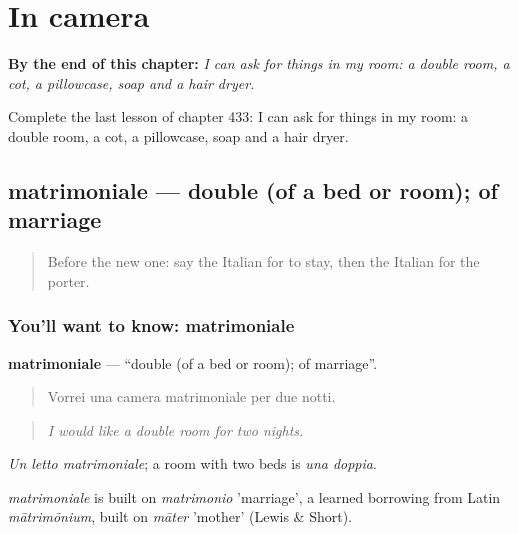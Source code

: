 
\chapter{In camera}
\label{ch:it-in-camera}

\begin{chapteropening}
\textbf{By the end of this chapter:} \emph{I can ask for things in my room: a double room, a cot, a pillowcase, soap and a hair dryer.}

Complete the last lesson of chapter 433: I can ask for things in my room: a double room, a cot, a pillowcase, soap and a hair dryer.
\end{chapteropening}

\section[matrimoniale]{matrimoniale — double (of a bed or room); of marriage}

\label{lesson:IT-C433-matrimoniale}



\begin{quote}
Before the new one: say the Italian for to stay, then the Italian for the porter.
\end{quote}

\subsection*{You'll want to know: matrimoniale}
\textbf{matrimoniale} — \textquotedblleft{}double (of a bed or room); of marriage\textquotedblright{}.

\begin{quote}
Vorrei una camera matrimoniale per due notti.
\end{quote}

\begin{quote}
\emph{I would like a double room for two nights.}
\end{quote}

\emph{Un letto matrimoniale}; a room with two beds is \emph{una doppia}.

\begin{cousinweb}
\emph{matrimoniale} is built on \emph{matrimonio} 'marriage', a learned borrowing from Latin \emph{mātrimōnium}, built on \emph{māter} 'mother' (Lewis \& Short).
\end{cousinweb}

